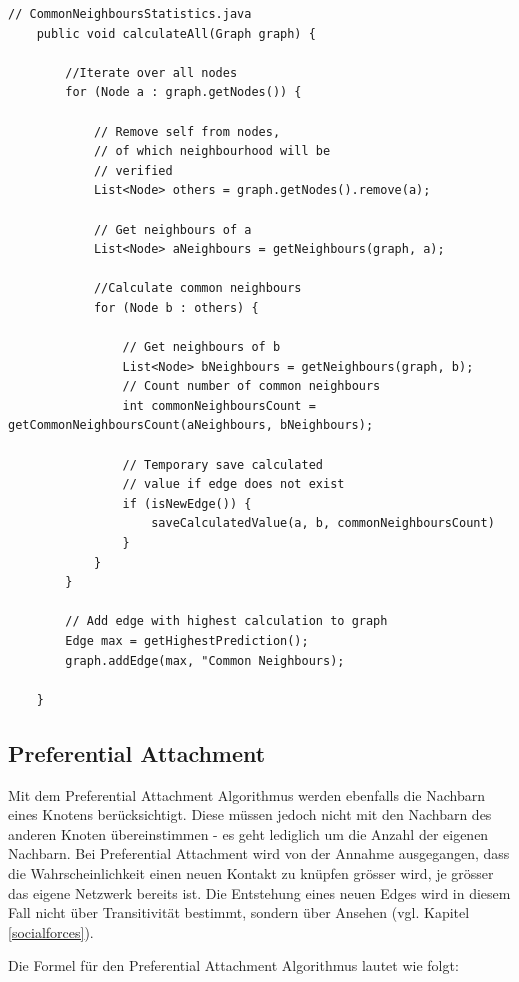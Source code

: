 \begin{lstlisting}[caption={Common neighbour implementation},label=lstCommonNeighbour]
    // CommonNeighboursStatistics.java
    public void calculateAll(Graph graph) {

        //Iterate over all nodes
        for (Node a : graph.getNodes()) {

            // Remove self from nodes,
            // of which neighbourhood will be
            // verified
            List<Node> others = graph.getNodes().remove(a);

            // Get neighbours of a
            List<Node> aNeighbours = getNeighbours(graph, a);

            //Calculate common neighbours
            for (Node b : others) {

                // Get neighbours of b
                List<Node> bNeighbours = getNeighbours(graph, b);
                // Count number of common neighbours
                int commonNeighboursCount = getCommonNeighboursCount(aNeighbours, bNeighbours);

                // Temporary save calculated
                // value if edge does not exist
                if (isNewEdge()) {
                    saveCalculatedValue(a, b, commonNeighboursCount)
                }
            }
        }

        // Add edge with highest calculation to graph
        Edge max = getHighestPrediction();
        graph.addEdge(max, "Common Neighbours);

    }
\end{lstlisting}

\subsection{Preferential Attachment}
Mit dem Preferential Attachment Algorithmus werden ebenfalls die Nachbarn eines Knotens berücksichtigt. Diese müssen jedoch nicht
mit den Nachbarn des anderen Knoten übereinstimmen - es geht lediglich um die Anzahl der eigenen Nachbarn. Bei Preferential Attachment
wird von der Annahme ausgegangen, dass die Wahrscheinlichkeit einen neuen Kontakt zu knüpfen grösser wird, je grösser das eigene Netzwerk bereits ist.
Die Entstehung eines neuen Edges wird in diesem Fall nicht über Transitivität bestimmt, sondern über Ansehen (vgl. Kapitel \ref{socialforces}).

Die Formel für den Preferential Attachment Algorithmus lautet wie folgt:

